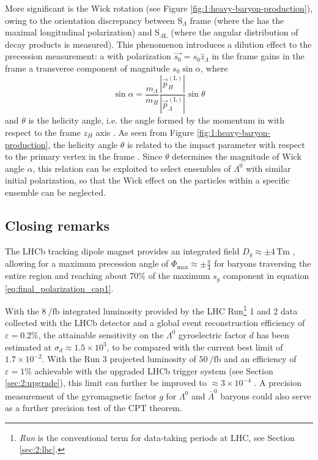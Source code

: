 More significant is the Wick rotation (see Figure \ref{fig:1:heavy-baryon-production}), owing to the orientation discrepancy between $\text{S}_\Lambda$ frame (where the \lz has the maximal longitudinal polarization)  and $\text{S}_{\Lambda \text{L}}$ (where the angular distribution of \lz decay products is measured).
This phenomenon introduces a dilution effect to the precession measurement: a \lz with polarization $\vec{s_0} = s_0 \hat{z}_\Lambda$ in the \slambda frame gains in the \slambdal frame a transverse component of magnitude $s_0 \sin\alpha$, where
\begin{equation}
\sin\alpha =
\frac{m_\Lambda}{m_H}
\frac{\left\lvert \vec{p}_H^{(\text{L})} \right\lvert}{\left\lvert \vec{p}_\Lambda^{(\text{L})} \right\lvert}
\sin\theta
\label{eq:1:wick_rotation}
\end{equation}
and $\theta$ is the \lz helicity angle, i.e. the angle formed by the \lz momentum in \shad with respect to the frame $z_H$ axis \cite{spinInParticlePhysics}.
As seen from Figure \ref{fig:1:heavy-baryon-production}, the helicity angle $\theta$ is related to the impact parameter with respect to the primary vertex in the \slab frame \cite{GROSNICK1990269}.
Since $\theta$ determines the magnitude of Wick angle $\alpha$, this relation can be exploited to select ensembles of $\Lambda^0$ with similar initial polarization, so that the Wick effect on the particles within a specific ensemble can be neglected.

\subsection{Closing remarks}

The LHCb tracking dipole magnet provides an integrated field $D_y \approx \pm 4 \,\si{\tesla\meter}$ \cite{LHCbDetectorPerformance}, allowing for a maximum precession angle of $\Phi_\text{max} \approx \pm \frac{\pi}{4}$ for \lz baryons traversing the entire region and reaching about 70\% of the maximum $s_y$ component in equation \eqref{eq:final_polarization_cap1}.

With the $8~\si{\per\femto\barn}$ integrated luminosity provided by the LHC Run\footnote{\textit{Run} is the conventional term for data-taking periods at LHC, see Section \ref{sec:2:lhc}.} 1 and 2 data collected with the LHCb detector and a global event reconstruction efficiency of $\varepsilon = 0.2\%$, the attainable sensitivity on the $\Lambda^0$ gyroelectric factor $d$ has been estimated at $\sigma_d \approx 1.5\times {10}^3$, to be compared with the current best limit of $1.7 \times {10}^{-2}$.
With the Run 3 projected luminosity of $\SI{50}{\per\femto\barn}$ and an efficiency of $\varepsilon = 1\%$ achievable with the upgraded LHCb trigger system (see Section \ref{sec:2:upgrade}), this limit can further be improved to $\approx 3\times {10}^{-4}$ \cite{EMDipoleSearch}.
A precision measurement of the gyromagnetic factor $g$ for $\Lambda^0$ and $\bar{\Lambda}^0$ baryons could also serve as a further precision test of the CPT theorem.


